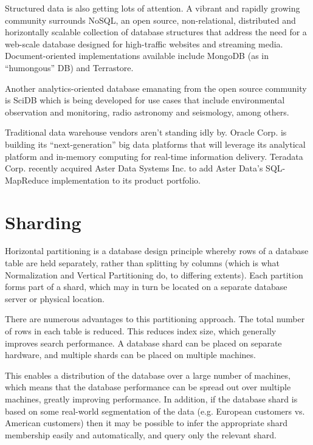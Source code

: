 \documentclass[11pt]{article} %
\begin{document}
Structured data is also getting lots of attention. A vibrant and rapidly growing community surrounds NoSQL, an open source, non-relational, distributed and horizontally scalable collection of database structures that address the need for a web-scale database designed for high-traffic websites and streaming media. Document-oriented implementations available include MongoDB (as in “humongous” DB) and Terrastore.


Another analytics-oriented database emanating from the open source community is SciDB which is being developed for use cases that include environmental observation and monitoring, radio astronomy and seismology, among others.


Traditional data warehouse vendors aren't standing idly by. Oracle Corp. is building its “next-generation” big data platforms that will leverage its analytical platform and in-memory computing for real-time information delivery. Teradata Corp. recently acquired Aster Data Systems Inc. to add Aster Data’s SQL-MapReduce implementation to its product portfolio.
\newpage
\section{Sharding}


Horizontal partitioning is a database design principle whereby rows of a database table are held separately, rather than splitting by columns (which is what Normalization and Vertical Partitioning do, to differing extents). Each partition forms part of a shard, which may in turn be located on a separate database server or physical location.


There are numerous advantages to this partitioning approach. The total number of rows in each table is reduced. This reduces index size, which generally improves search performance. A database shard can be placed on separate hardware, and multiple shards can be placed on multiple machines.


This enables a distribution of the database over a large number of machines, which means that the database performance can be spread out over multiple machines, greatly improving performance. In addition, if the database shard is based on some real-world segmentation of the data (e.g. European customers vs. American customers) then it may be possible to infer the appropriate shard membership easily and automatically, and query only the relevant shard.
\end{document}
